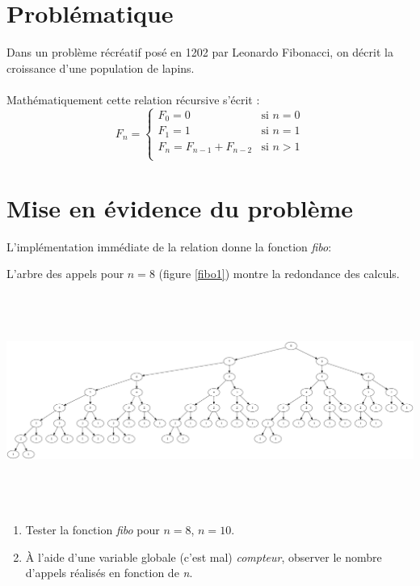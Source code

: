 \documentclass[a4paper,11pt]{article}
\begin{document}
\section{Problématique}
Dans un problème récréatif posé en 1202 par Leonardo Fibonacci, on décrit la croissance d'une population de lapins.\\
\\

Mathématiquement cette relation récursive s'écrit :
$$
F_n = \left\{
    \begin{array}{ll}
        F_0 = 0 & \mbox{si } n=0\\
        F_1=1 & \mbox{si } n=1\\
        F_{n} = F_{n-1}+F_{n-2} & \mbox{si } n>1\\
    \end{array}
    \right.
$$
\begin{center}
\end{center}
\section{Mise en évidence du problème}
L'implémentation immédiate de la relation donne la fonction \emph{fibo}:

L'arbre des appels pour $n=8$ (figure \ref{fibo1}) montre la redondance des calculs.
\begin{center}
    \centering
    \includegraphics[width=17cm, height=7cm]{ressources/fibo1.png}
    \label{fibo1}
\end{center}
\begin{activite}
\begin{enumerate}
    \item Tester la fonction \emph{fibo} pour $n=8$, $n=10$.
    \item À l'aide d'une variable globale (c'est mal) \emph{compteur}, observer le nombre d'appels réalisés en fonction de \emph{n}.
\end{enumerate}
\end{activite}
\end{document}
